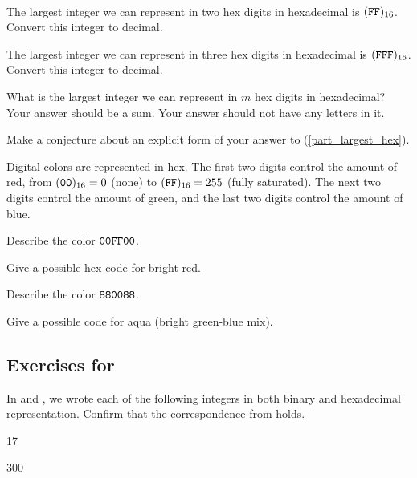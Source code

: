 \begin{exer}[\exerE] %
\label{exer_largest_hex}
~
    \begin{apart}
        \item The largest integer we can represent in two hex digits in hexadecimal is $(\texttt{FF})_{16}$.  Convert this integer to decimal.
        \item The largest integer we can represent in three hex digits in hexadecimal is $(\texttt{FFF})_{16}$.  Convert this integer to decimal.
        \item  \label{part_largest_hex} What is the largest integer we can represent in $m$ hex digits in hexadecimal?  Your answer should be a sum.  Your answer should not have any letters in it.
        \item Make a conjecture about an explicit form of your answer to (\ref{part_largest_hex}). 
    \end{apart}
\end{exer}

\begin{exer}[\exerE] %
\label{exer_RBG_colors_hex}
  Digital colors are represented in hex.  The first two digits control the amount of red, from $(\texttt{00})_{16}=0$ (none) to $(\texttt{FF})_{16}=255$ (fully saturated).  The next two digits control the amount of green, and the last two digits control the amount of blue.  
    \begin{exerpart}
        \item Describe the color $\texttt{00FF00}$.
        \item Give a possible hex code for bright red.
        \item Describe the color $\texttt{880088}$.
        \item Give a possible code for aqua (bright green-blue mix).
    \end{exerpart}
\end{exer}


\subsection*{Exercises for  \subhexforbinary}

\begin{exer}[\exerP] %
\label{exer_check_conv_bin_hex}
In  and , we wrote each of the following integers in both binary and hexadecimal representation.  Confirm that the correspondence from  holds.
    \begin{exerpart}
        \item 17
        \item 300
    \end{exerpart}
\end{exer}

